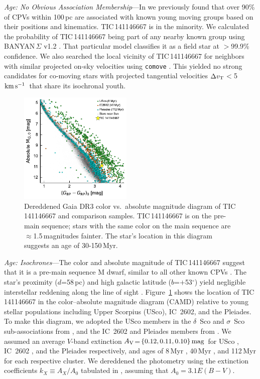\documentclass[11pt,twocolumn,tighten,linenumbers]{aastex7}
\newcommand{\kms}{\ensuremath{\rm km\,s^{-1}}}
\begin{document}
{\it Age: No Obvious Association Membership}---In
\citet{Bouma2024} we previously found that over 90\% of CPVs within
100\,pc are associated with
known young moving groups based on their positions and kinematics.
TIC\,141146667 is in the minority.  We calculated the probability of
TIC\,141146667 being part of any nearby known group using
BANYAN\,$\Sigma$ v1.2 \citep{Gagne2018}.  That particular model
classifies it as a field star at $>$99.9\% confidence.  We also
searched the local vicinity of TIC\,141146667 for neighbors with
similar projected on-sky velocities using \texttt{comove}
\citep{Tofflemire2021}.  This yielded no strong candidates for
co-moving stars with projected tangential velocities $\Delta v_{\rm
T}$$<$5\,\kms\ that share its isochronal youth.

\begin{figure}[!t]
  \centering
  \includegraphics[width=0.48\textwidth]{figures/sf3.pdf}
  \caption{Dereddened Gaia DR3 color vs.~absolute magnitude diagram of
  TIC\,141146667 and comparison samples. 
  TIC\,141146667 is on the pre-main sequence; stars with the same color
  on the main sequence are $\approx$1.5\,magnitudes
  fainter.  The star's location in this diagram suggests an
  age of 30-150\,Myr.  }
  \label{fig:camd}
\end{figure}


{\it Age: Isochrones}---The color and absolute magnitude of
TIC\,141146667 suggest that it is a pre-main sequence M dwarf, similar
to all other known CPVs \citep{Stauffer2017,Stauffer2021,Bouma2024}.
The star's proximity ($d$=58\,pc) and high galactic latitude
($b$=$+$53$^\circ$) yield negligible interstellar reddening along the
line of sight \citep{Green2019}.  Figure~\ref{fig:camd}
shows the location of TIC\,141146667 in the color--absolute magnitude
diagram (CAMD) relative to young stellar populations including Upper
Scorpius (USco), IC~2602, and the Pleiades.  To make this diagram, we
adopted the USco members in the $\delta$~Sco and $\sigma$~Sco
sub-associations from \citet{Ratzenbock2023}, and the IC~2602 and
Pleiades members from \citet{Hunt2024}.  We assumed an average $V$-band
extinction $A_{\rm V}$=$\{0.12, 0.11, 0.10\}\,{\rm mag}$ for USco
\citep{Pecaut2016}, IC~2602 \citep{Hunt2024}, and the Pleiades
\citep{Hunt2024} respectively, and ages of 8\,Myr
\citep{Ratzenbock2023}, 40\,Myr \citep{Randich2018}, and 112\,Myr
\citep{Dahm2015} for each respective cluster.  We dereddened the
photometry using the extinction coefficients $k_X\equiv A_X/A_0$
tabulated in \citep{GaiaCollaboration2018}, assuming that $A_0 = 3.1
E(B-V)$.
\end{document}
